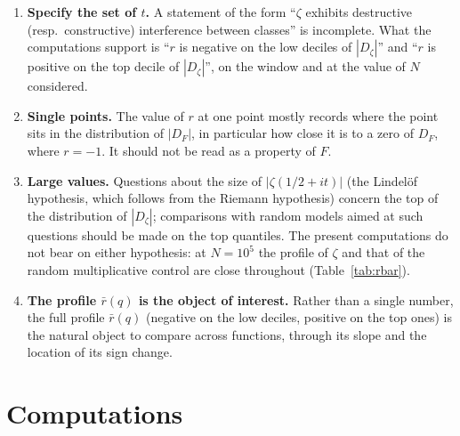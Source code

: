 \documentclass[11pt]{amsart}
\theoremstyle{definition}
\theoremstyle{remark}
\begin{document}
\begin{enumerate}[label=(\alph*)]
\item \textbf{Specify the set of $t$.} A statement of the form ``$\zeta$
exhibits destructive (resp.\ constructive) interference between classes''
is incomplete. What the computations support is ``$r$ is negative on the
low deciles of $|D_\zeta|$'' and ``$r$ is positive on the top decile of
$|D_\zeta|$'', on the window and at the value of $N$ considered.
\item \textbf{Single points.} The value of $r$ at one point mostly
records where the point sits in the distribution of $|D_F|$, in
particular how close it is to a zero of $D_F$, where $r=-1$. It should
not be read as a property of $F$.
\item \textbf{Large values.} Questions about the size of
$|\zeta(1/2+it)|$ (the Lindel\"of hypothesis, which follows from the
Riemann hypothesis) concern the top of the distribution of $|D_\zeta|$;
comparisons with random models aimed at such questions should be made on
the top quantiles. The present computations do not bear on either
hypothesis: at $N=10^5$ the profile of $\zeta$ and that of the random
multiplicative control are close throughout (Table~\ref{tab:rbar}).
\item \textbf{The profile $\bar r(q)$ is the object of interest.} Rather
than a single number, the full profile $\bar r(q)$ (negative on the low
deciles, positive on the top ones) is the natural object to compare
across functions, through its slope and the location of its sign change.
\end{enumerate}

\appendix
\section{Computations}
\label{app:repro}
\end{document}
